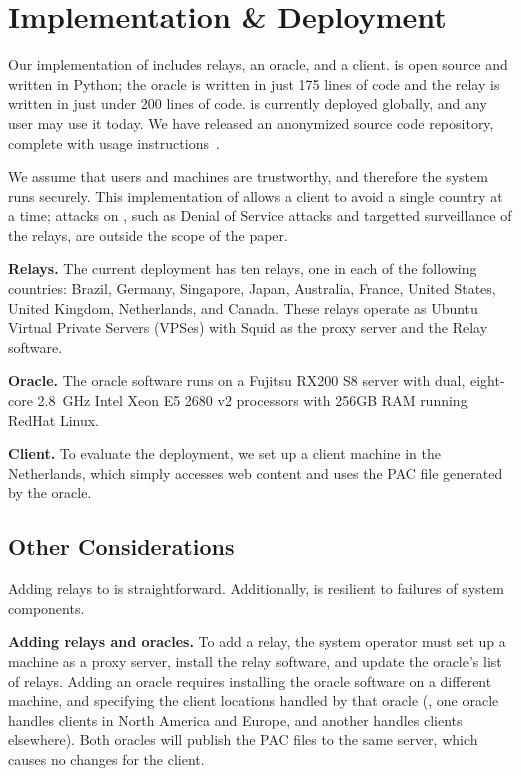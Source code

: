 \section{Implementation \& Deployment}

Our implementation of \system{} includes relays, an oracle, and 
a client. \system{} is open source and written in Python; the oracle is written in just 
175 lines of code and the relay is written in just under 200 lines of code.  \system{} is currently deployed globally, and
any user may use it today.  We have released an anonymized source code repository,
complete with usage instructions~\cite{ran_system}.

We assume that users and machines are trustworthy, and therefore the system runs 
securely.  This implementation of \system{} allows a client to avoid a single country 
at a time; attacks on \system{}, such as Denial of Service attacks and targetted 
surveillance of the relays, are outside the scope of the paper.

{\bf Relays.}  The current deployment has ten relays, one in each
of the following
countries: Brazil,  Germany, Singapore, Japan, Australia, France, United
States, United Kingdom, Netherlands, and Canada.  These relays operate
as Ubuntu Virtual Private Servers (VPSes) with Squid as the proxy
server and the \system{} Relay software.


{\bf Oracle.}  The oracle software runs on a Fujitsu RX200 S8 server with dual, 
eight-core 2.8~GHz Intel Xeon E5 2680 v2 processors with 256GB RAM running 
RedHat Linux. 

{\bf Client.} To evaluate the \system{} deployment, we set up a client 
machine in the Netherlands, which simply accesses web content and uses the PAC 
file generated by the oracle. 

\subsection{Other Considerations}
Adding relays to \system{} is 
straightforward. Additionally, \system{} is resilient to failures of system components.

{\bf Adding relays and oracles.} To add a relay, the system
operator must set up a machine as a proxy server, install the relay
software, and update the oracle's list of relays.  %
Adding an oracle requires installing
the oracle software on a different machine, and specifying the client
locations handled by that oracle (\eg, one oracle handles clients in
North America and Europe, and another handles clients elsewhere).
Both oracles will publish the PAC files to the same server, which
causes no changes for the client.

